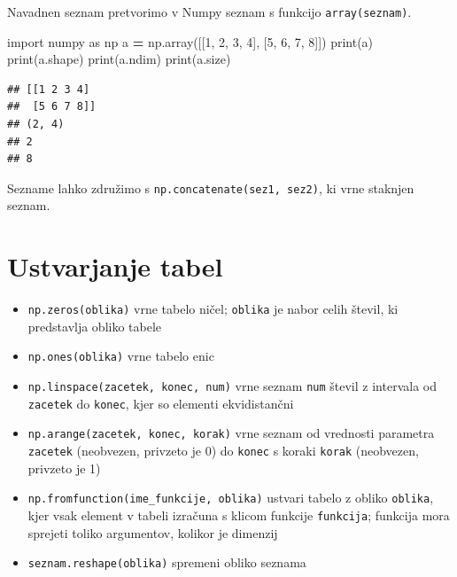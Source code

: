 \documentclass[
]{book}
\newenvironment{Shaded}{\begin{snugshade}}{\end{snugshade}}
\newcommand{\BuiltInTok}[1]{#1}
\newcommand{\DecValTok}[1]{\textcolor[rgb]{0.00,0.00,0.81}{#1}}
\newcommand{\ImportTok}[1]{#1}
\newcommand{\NormalTok}[1]{#1}
\newcommand{\OperatorTok}[1]{\textcolor[rgb]{0.81,0.36,0.00}{\textbf{#1}}}
\providecommand{\tightlist}{%
  \setlength{\itemsep}{0pt}\setlength{\parskip}{0pt}}
\begin{document}
Navadnen seznam pretvorimo v Numpy seznam s funkcijo \texttt{array(seznam)}.

\begin{Shaded}
\begin{Highlighting}[]
\ImportTok{import}\NormalTok{ numpy }\ImportTok{as}\NormalTok{ np}
\NormalTok{a }\OperatorTok{=}\NormalTok{ np.array([[}\DecValTok{1}\NormalTok{, }\DecValTok{2}\NormalTok{, }\DecValTok{3}\NormalTok{, }\DecValTok{4}\NormalTok{], [}\DecValTok{5}\NormalTok{, }\DecValTok{6}\NormalTok{, }\DecValTok{7}\NormalTok{, }\DecValTok{8}\NormalTok{]])}
\BuiltInTok{print}\NormalTok{(a)}
\BuiltInTok{print}\NormalTok{(a.shape)}
\BuiltInTok{print}\NormalTok{(a.ndim)}
\BuiltInTok{print}\NormalTok{(a.size)}
\end{Highlighting}
\end{Shaded}

\begin{verbatim}
## [[1 2 3 4]
##  [5 6 7 8]]
## (2, 4)
## 2
## 8
\end{verbatim}

Sezname lahko združimo s \texttt{np.concatenate(sez1,\ sez2)}, ki vrne staknjen seznam.

\hypertarget{ustvarjanje-tabel}{%
\section{Ustvarjanje tabel}\label{ustvarjanje-tabel}}

\begin{itemize}
\tightlist
\item
  \texttt{np.zeros(oblika)} vrne tabelo ničel; \texttt{oblika} je nabor celih števil, ki predstavlja obliko tabele
\item
  \texttt{np.ones(oblika)} vrne tabelo enic
\item
  \texttt{np.linspace(zacetek,\ konec,\ num)} vrne seznam \texttt{num} števil z intervala od \texttt{zacetek} do \texttt{konec}, kjer so elementi ekvidistančni
\item
  \texttt{np.arange(zacetek,\ konec,\ korak)} vrne seznam od vrednosti parametra \texttt{zacetek} (neobvezen, privzeto je 0) do \texttt{konec} s koraki \texttt{korak} (neobvezen, privzeto je 1)
\item
  \texttt{np.fromfunction(ime\_funkcije,\ oblika)} ustvari tabelo z obliko \texttt{oblika}, kjer
  vsak element v tabeli izračuna s klicom funkcije \texttt{funkcija}; funkcija mora sprejeti toliko argumentov, kolikor je dimenzij
\item
  \texttt{seznam.reshape(oblika)} spremeni obliko seznama
\end{itemize}
\end{document}
